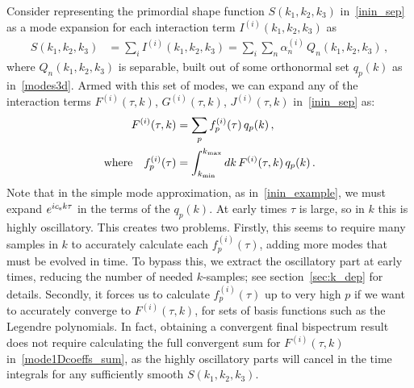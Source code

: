 Consider representing the primordial shape function $S(k_1, k_2, k_3)$ in~\eqref{inin_sep} as
a mode expansion for each interaction term $I^{(i)}(k_1, k_2,k_3)$ as
\begin{align}\label{modeexp}
S(k_1, k_2,k_3) &= \sum_i I^{(i)}(k_1,k_2,k_3) =  \sum_i \sum_n \alpha_n^{(i)}  \, Q_n(k_1,k_2,k_3)\,,
\end{align}
where $Q_n(k_1,k_2,k_3)$ is separable, built out of some
orthonormal set $q_p(k)$ as in~\eqref{modes3d}.
Armed with this set of modes,
we can expand any of the interaction terms $F^{(i)}(\tau, k)$, $G^{(i)}(\tau, k)$, $J^{(i)}(\tau, k)$
in~\eqref{inin_sep} as:
\begin{align}
    F^{(i)}(\tau, k) &= \sum _p f_p^{(i)} (\tau) \, q_p(k)\,,\label{mode1Dcoeffs_sum}\\
    \text{where} \quad f_p^{(i)} (\tau)  &= \int _{k_\text{min}}^{k_\text{max}} dk \,F^{(i)}(\tau, k) \, q_p(k) \,.\label{mode1Dcoeffs_integral}
\end{align}
Note that in the simple mode approximation, as in~\eqref{inin_example},
we must expand $e^{ic_{\rm s} k\tau}$ in the terms of the $q_p(k)$.
At early times $\tau$ is large, so in $k$ this is highly oscillatory.
This creates two problems. Firstly, this seems to require many samples
in $k$ to accurately calculate each $f_p^{(i)} (\tau)$,
adding more modes that must be evolved in time.
To bypass this, we extract the oscillatory part at
early times, reducing the number of needed
$k$-samples; see section~\eqref{sec:k_dep} for details.
Secondly, it forces us to calculate $f_p^{(i)} (\tau)$
up to very high $p$ if we want to accurately converge to $F^{(i)}(\tau, k)$,
for sets of basis functions such as the Legendre polynomials.
In fact, obtaining a convergent final bispectrum result
does not require calculating the full convergent sum
for $F^{(i)}(\tau, k)$ in~\eqref{mode1Dcoeffs_sum},
as the highly oscillatory parts will cancel in the time integrals
for any sufficiently smooth $S(k_1,k_2,k_3)$.

